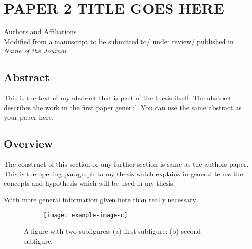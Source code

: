 \chapter{\MakeUppercase{Paper 2 Title Goes Here}}

\begin{center}
	Authors and Affiliations \\
	Modified from a manuscript to be submitted to/ under review/ published in \textit{Name of the Journal}
\end{center}

\section{Abstract}
This is the text of my abstract that is part of the thesis itself.
The abstract describes the work in the first paper general. You can use the same abstract as your paper here.



\section{Overview}

The  construct of this section or any further section is same as the authors paper.
This is the opening paragraph to my thesis which
explains in general terms the concepts and hypothesis
which will be used in my thesis.

With more general information given here than really
necessary.
\begin{figure}[b]
	\centering
	\begin{subfigure}[c]{0.495\textwidth}
		\texttt{[image: example-image-c]}%
		\subcaption{\label{fig:2a}}
	\end{subfigure}
	\begin{subfigure}[c]{0.495\textwidth}
		\subcaption{\label{fig:2b}}%
	\end{subfigure}%
	\caption{A figure with two subfigures: (a) first subfigure; (b) second subfigure.\label{fig:2}}
\end{figure}


